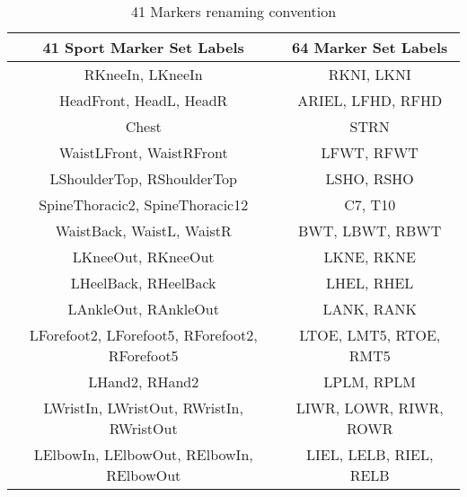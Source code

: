 \begin{table}[H]
    \centering
    \begin{tabular}{|c|c|}
    \hline
    \textbf{41 Sport Marker Set Labels} & \textbf{64 Marker Set Labels} \\
    \hline
    RKneeIn, LKneeIn & RKNI, LKNI \\
    HeadFront, HeadL, HeadR & ARIEL, LFHD, RFHD \\
    Chest & STRN \\
    WaistLFront, WaistRFront & LFWT, RFWT \\
    LShoulderTop, RShoulderTop & LSHO, RSHO \\
    SpineThoracic2, SpineThoracic12 & C7, T10 \\
    WaistBack, WaistL, WaistR & BWT, LBWT, RBWT \\
    LKneeOut, RKneeOut & LKNE, RKNE \\
    LHeelBack, RHeelBack & LHEL, RHEL \\
    LAnkleOut, RAnkleOut & LANK, RANK \\
    LForefoot2, LForefoot5, RForefoot2, RForefoot5& LTOE, LMT5, RTOE, RMT5\\
    LHand2, RHand2 & LPLM, RPLM \\
    LWristIn, LWristOut, RWristIn, RWristOut & LIWR, LOWR, RIWR, ROWR \\
    LElbowIn, LElbowOut, RElbowIn, RElbowOut & LIEL, LELB, RIEL, RELB \\
    \hline
    \end{tabular}
    \caption{41 Markers renaming convention}
    \label{tab:marker_mapping_41}
\end{table}

